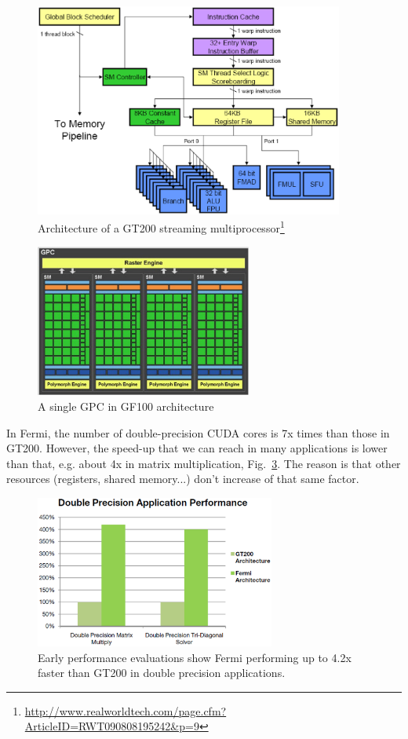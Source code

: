 \begin{figure}[hbt]
  \centerline{\includegraphics[height=7cm,
    angle=0]{./images/gt200_sm.eps}}
  \caption{Architecture of a GT200 streaming multiprocessor\footnote{\url{http://www.realworldtech.com/page.cfm?ArticleID=RWT090808195242&p=9}}}
  \label{fig:gt200_sm}
\end{figure}


\begin{figure}[hbt]
  \centerline{\includegraphics[height=5cm,
    angle=0]{./images/Fermi_GPC.eps}}
  \caption{A single GPC in GF100 architecture}
  \label{fig:Fermi_GPC}
\end{figure}


In Fermi, the number of double-precision CUDA cores is 7x times than
those in GT200. However, the speed-up that we can reach in many
applications is lower than that, e.g. about 4x in matrix
multiplication, Fig.~\ref{fig:matrix_mul}. The reason is that other
resources (registers, shared memory...) don't increase of that same
factor. 

\begin{figure}[hbt]
  \centerline{\includegraphics[height=5cm,
    angle=0]{./images/matrix_mul_fermi.eps}}
  \caption{Early performance evaluations show Fermi performing up to
    4.2x faster than GT200 in double precision applications.}
\label{fig:matrix_mul}
\end{figure}


